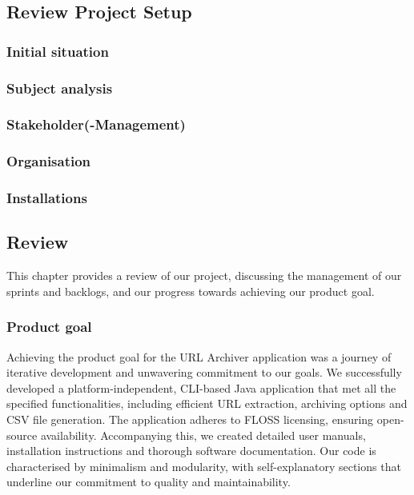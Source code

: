\subsection{Review Project Setup}

\subsubsection{Initial situation}

\subsubsection{Subject analysis}

\subsubsection{Stakeholder(-Management)}

\subsubsection{Organisation}

\subsubsection{Installations}


\subsection{Review}
This chapter provides a review of our project, discussing the management of our sprints and backlogs, and our progress towards achieving our product goal.

\subsubsection{Product goal}
Achieving the product goal for the URL Archiver application was a journey of iterative development and unwavering commitment to our goals.
We successfully developed a platform-independent, CLI-based Java application that met all the specified functionalities, including efficient URL extraction, archiving options and CSV file generation.
The application adheres to FLOSS licensing, ensuring open-source availability.
Accompanying this, we created detailed user manuals, installation instructions and thorough software documentation.
Our code is characterised by minimalism and modularity, with self-explanatory sections that underline our commitment to quality and maintainability.

